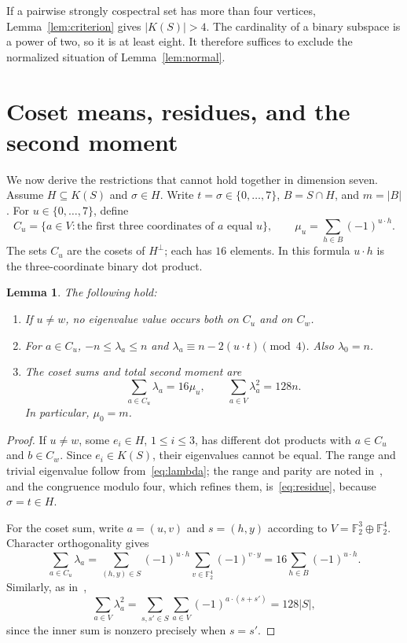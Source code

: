 \documentclass[11pt]{article}
\newtheorem{lemma}[theorem]{Lemma}
\theoremstyle{definition}
\newcommand{\F}{\mathbb F}
\begin{document}
If a pairwise strongly cospectral set has more than four vertices,
Lemma~\ref{lem:criterion} gives $|K(S)|>4$.
The cardinality of a binary subspace is a power of two, so it is at least
eight. It therefore suffices to exclude the normalized situation of
Lemma~\ref{lem:normal}.

\section{Coset means, residues, and the second moment}\label{sec:moments}
We now derive the restrictions that cannot hold together in dimension
seven. Assume $H\subseteq K(S)$ and $\sigma\in H$.
Write $t=\sigma\in\{0,\ldots,7\}$, $B=S\cap H$, and $m=|B|$.
For $u\in\{0,\ldots,7\}$, define
\[
 C_u=\{a\in V:\text{the first three coordinates of }a\text{ equal }u\},
 \qquad \mu_u=\sum_{h\in B}(-1)^{u\cdot h}.
\]
The sets $C_u$ are the cosets of $H^\perp$; each has $16$ elements.
In this formula $u\cdot h$ is the three-coordinate binary dot product.

\begin{lemma}\label{lem:cosets}
The following hold:
\begin{enumerate}
\item If $u\ne w$, no eigenvalue value occurs both on $C_u$ and on $C_w$.
\item For $a\in C_u$, $-n\leq\lambda_a\leq n$ and
$\lambda_a\equiv n-2(u\cdot t)\pmod4$. Also $\lambda_0=n$.
\item The coset sums and total second moment are
\begin{equation}\label{eq:moments}
 \sum_{a\in C_u}\lambda_a=16\mu_u,\qquad
 \sum_{a\in V}\lambda_a^2=128n.
\end{equation}
In particular, $\mu_0=m$.
\end{enumerate}
\end{lemma}
\begin{proof}
If $u\ne w$, some $e_i\in H$, $1\leq i\leq3$, has different dot
products with $a\in C_u$ and $b\in C_w$. Since $e_i\in K(S)$,
their eigenvalues cannot be equal.
The range and trivial eigenvalue follow from~\eqref{eq:lambda}; the
range and parity are noted in~\cite[Section~7]{AG}, and the
congruence modulo four, which refines them, is~\eqref{eq:residue},
because $\sigma=t\in H$.

For the coset sum, write $a=(u,v)$ and $s=(h,y)$ according to
$V=\F_2^3\oplus\F_2^4$. Character orthogonality gives
\[
 \sum_{a\in C_u}\lambda_a
 =\sum_{(h,y)\in S}(-1)^{u\cdot h}
                 \sum_{v\in\F_2^4}(-1)^{v\cdot y}
 =16\sum_{h\in B}(-1)^{u\cdot h}.
\]
Similarly, as in~\cite[Lemma~7.2]{AG},
\[
 \sum_{a\in V}\lambda_a^2
 =\sum_{s,s'\in S}\sum_{a\in V}(-1)^{a\cdot(s+s')}
 =128|S|,
\]
since the inner sum is nonzero precisely when $s=s'$.
\end{proof}
\end{document}
